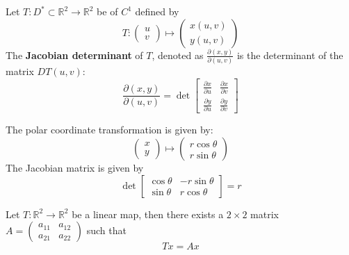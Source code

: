 \documentclass[openany]{book}
\newcommand{\R}{\mathbb{R}}
\begin{document}
\begin{defn}
    Let $T:D^*\subset\R^2\to\R^2$ be of $C^1$ defined by 
    \begin{equation*}
        T:\begin{pmatrix}
            u\\
            v
        \end{pmatrix}\mapsto \begin{pmatrix}
            x(u,v)\\
            y(u,v)
        \end{pmatrix}
    \end{equation*}
    The \textbf{Jacobian determinant} of $T$, denoted as $\frac{\partial(x,y)}{\partial(u,v)}$ is the determinant of the matrix $DT(u,v)$:
    \begin{equation*}
        \frac{\partial(x,y)}{\partial(u,v)}=\det\begin{bmatrix}
            \frac{\partial x}{\partial u}& \frac{\partial x}{\partial v}\\
            \frac{\partial y}{\partial u}&\frac{\partial y}{\partial v}
        \end{bmatrix}
    \end{equation*}
\end{defn}


\begin{example}
    The polar coordinate transformation is given by:
    \begin{equation*}
        \begin{pmatrix}
            x\\
            y
        \end{pmatrix}\mapsto \begin{pmatrix}
            r\cos\theta\\
            r\sin\theta
        \end{pmatrix}
    \end{equation*}
    The Jacobian matrix is given by 
    \begin{equation*}
        \det\begin{bmatrix}
            \cos\theta&-r\sin\theta\\
            \sin\theta&r\cos\theta
        \end{bmatrix}=r
    \end{equation*}
\end{example}



\begin{prop}
    Let $T:\R^2\to\R^2$ be a linear map, then there exists a $2\times 2$ matrix $A=\begin{pmatrix}
        a_{11}&a_{12}\\
        a_{21}&a_{22}
    \end{pmatrix}$ such that 
    \begin{equation*}
        Tx=Ax
    \end{equation*}
\end{prop}
\end{document}
